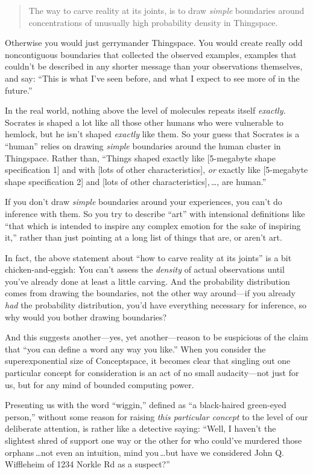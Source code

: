 {\begin{quote}
 The way to carve reality at its joints, is to draw \textit{simple}
boundaries around concentrations of unusually high probability density
in Thingspace.
\end{quote}


 Otherwise you would just gerrymander Thing\-space. You would create
really odd noncontiguous boundaries that collected the observed
examples, examples that couldn't be described in any
shorter message than your observations themselves, and say:
``This is what I've seen before, and
what I expect to see more of in the future.''


 In the real world, nothing above the level of molecules repeats
itself \textit{exactly.} Socrates is shaped a lot like all those other
humans who were vulnerable to hemlock, but he isn't
shaped \textit{exactly} like them. So your guess that Socrates is a
``human'' relies on drawing
\textit{simple} boundaries around the human cluster in Thingspace.
Rather than, ``Things shaped exactly like [5-megabyte
shape specification 1] and with [lots of other characteristics],
\textit{or} exactly like [5-megabyte shape specification 2] and [lots
of other characteristics],\,\ldots{}, are human.''


 If you don't draw \textit{simple} boundaries
around your experiences, you can't do inference with
them. So you try to describe ``art''
with intensional definitions like ``that which is
intended to inspire any complex emotion for the sake of inspiring
it,'' rather than just pointing at a long list of
things that are, or aren't art.


 In fact, the above statement about ``how to carve
reality at its joints'' is a bit chicken-and-eggish:
You can't assess the \textit{density} of actual
observations until you've already done at least a
little carving. And the probability distribution comes from drawing the
boundaries, not the other way around---if you already \textit{had} the
probability distribution, you'd have everything
necessary for inference, so why would you bother drawing boundaries?


 And this suggests another---yes, yet another---reason to be
suspicious of the claim that ``you can define a word
any way you like.'' When you consider the
superexponential size of Conceptspace, it becomes clear that singling
out one particular concept for consideration is an act of no small
audacity---not just for us, but for any mind of bounded computing
power.


 Presenting us with the word
``wiggin,'' defined as
``a black-haired green-eyed
person,'' without some reason for raising
\textit{this particular concept} to the level of our deliberate
attention, is rather like a detective saying: ``Well,
I haven't the slightest shred of support one way or the
other for who could've murdered those orphans\,\ldots not
even an intuition, mind you\,\ldots but have we considered John Q.
Wiffleheim of 1234 Norkle Rd as a suspect?''

}
